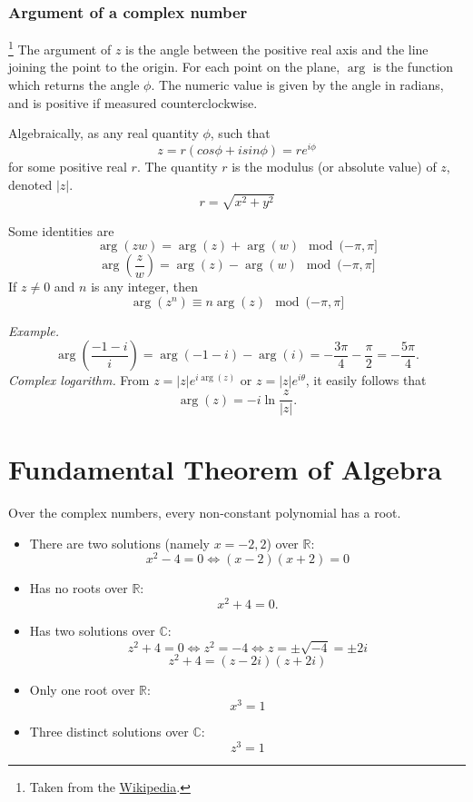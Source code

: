\documentclass[11pt]{article}
\begin{document}
    \subsubsection{Argument of a complex number}\footnote{Taken from the \href{https://en.wikipedia.org/wiki/Argument_(complex_analysis)}{Wikipedia}.}
    The argument of $z$ is the angle between the positive real axis and the line joining the point to the origin. For each point on the plane, \(\arg\) is the function which returns the angle \(\phi\). The numeric value is given by the angle in radians, and is positive if measured counterclockwise.

    Algebraically, as any real quantity \(\phi\), such that \[z = r(cos \phi + i sin \phi) = r e^{i \phi}\] for some positive real $r$. The quantity $r$ is the modulus (or absolute value) of $z$, denoted $|z|$. \[r = \sqrt{x^2 + y^2}\]

    Some identities are \[\arg(zw) = \arg(z) + \arg(w) \mod{(-\pi, \pi]}\] \[\arg \left(\frac{z}{w}\right) = \arg(z) - \arg(w) \mod{(-\pi, \pi]}\] If \(z \neq 0\) and $n$ is any integer, then \[\arg(z^n) \equiv n \arg(z) \mod{(-\pi,\pi]}\]
    
    \emph{Example.} \[\arg \left(\frac{-1 -i}{i}\right) = \arg (-1 - i) - \arg (i) = - \frac{3 \pi}{4} - \frac{\pi}{2} = - \frac{5 \pi}{4}.\] \emph{Complex logarithm.} From \(z = |z| e^{i \arg(z)}\) or \(z = |z| e^{i \theta}\), it easily follows that \[\arg(z) = -i \ln \frac{z}{|z|}.\]

    \pagebreak

    \section{Fundamental Theorem of Algebra}

    Over the complex numbers, every non-constant polynomial has a root.
    \begin{itemize}
        \item There are two solutions (namely \(x = -2, 2\)) over \(\mathbb{R}\): \[x^2 - 4 = 0 \Leftrightarrow (x-2)(x+2) = 0 \]
        \item Has no roots over \(\mathbb{R}\): \[x^2 + 4 = 0.\]
        \item Has two solutions over \(\mathbb{C}\): \[z^2 + 4 = 0 \Leftrightarrow z^2 = -4 \Leftrightarrow z = \pm \sqrt{-4} = \pm 2i\] \[z^2 + 4 = (z - 2i)(z + 2i)\]
        \item Only one root over \(\mathbb{R}\): \[x^3 = 1\]
        \item Three distinct solutions over \(\mathbb{C}\): \[z^3 = 1\]
    \end{itemize}
\end{document}
